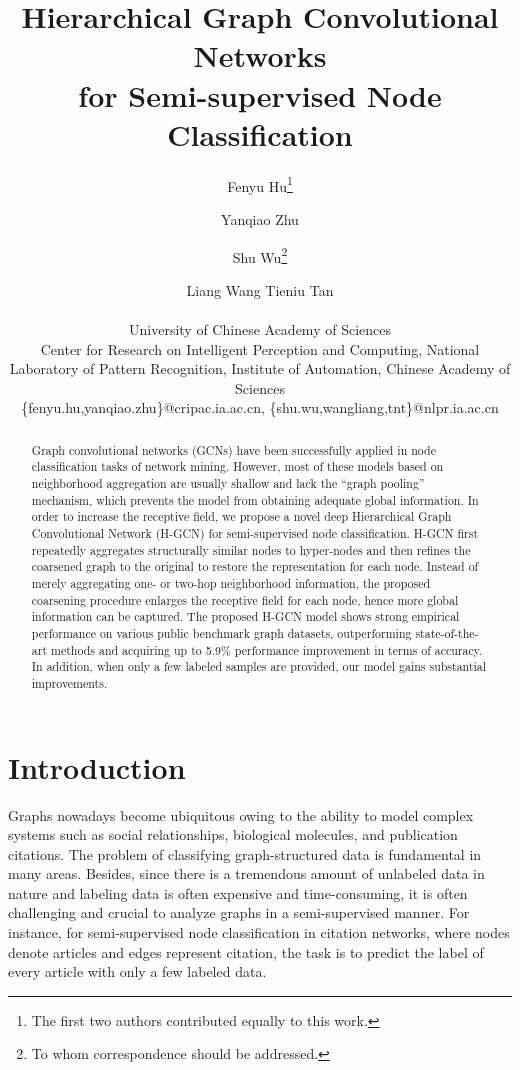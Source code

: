 \documentclass{article}
\title{Hierarchical Graph Convolutional Networks \\ for Semi-supervised Node Classification}
\author{
Fenyu Hu\footnote{The first two authors contributed equally to this work.}\and
Yanqiao Zhu\footnotemark[1]\and
Shu Wu\footnote{To whom correspondence should be addressed.}\and
Liang Wang\And
Tieniu Tan\\
\affiliations

University of Chinese Academy of Sciences\\

Center for Research on Intelligent Perception and Computing, National Laboratory of Pattern Recognition, Institute of Automation, Chinese Academy of Sciences\\
\emails
\{fenyu.hu,yanqiao.zhu\}@cripac.ia.ac.cn,
\{shu.wu,wangliang,tnt\}@nlpr.ia.ac.cn
}
\begin{document}
\maketitle

\begin{abstract}
Graph convolutional networks (GCNs) have been successfully applied in node classification tasks of network mining. However, most of these models based on neighborhood aggregation are usually shallow and lack the ``graph pooling'' mechanism, which prevents the model from obtaining adequate global information. In order to increase the receptive field, we propose a novel deep Hierarchical Graph Convolutional Network (H-GCN) for semi-supervised node classification. H-GCN first repeatedly aggregates structurally similar nodes to hyper-nodes and then refines the coarsened graph to the original to restore the representation for each node. Instead of merely aggregating one- or two-hop neighborhood information, the proposed coarsening procedure enlarges the receptive field for each node, hence more global information can be captured. The proposed H-GCN model shows strong empirical performance on various public benchmark graph datasets, outperforming state-of-the-art methods and acquiring up to 5.9\% performance improvement in terms of accuracy. In addition, when only a few labeled samples are provided, our model gains substantial improvements.
\end{abstract}

\section{Introduction}

Graphs nowadays become ubiquitous owing to the ability to model complex systems such as social relationships, biological molecules, and publication citations. The problem of classifying graph-structured data is fundamental in many areas. Besides, since there is a tremendous amount of unlabeled data in nature and labeling data is often expensive and time-consuming, it is often challenging and crucial to analyze graphs in a semi-supervised manner. For instance, for semi-supervised node classification in citation networks, where nodes denote articles and edges represent citation, the task is to predict the label of every article with only a few labeled data.
\end{document}
